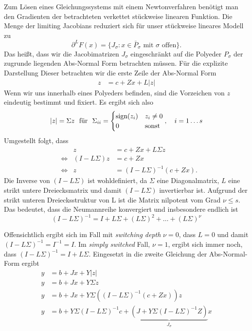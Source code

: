 Zum Lösen eines Gleichungssystems mit einem Newtonverfahren benötigt man den Gradienten der betrachteten verkettet stückweise linearen Funktion. 
Die Menge der limiting Jacobians reduziert sich für unser stückweise lineares Modell zu 
\[
 \partial^L F(x) = \lbrace J_\sigma: x\in \bar P_\sigma \text{ mit }\sigma \text{ offen} \rbrace.
\]
Das heißt, dass wir die Jacobimatrizen $J_\sigma$ eingeschränkt auf die Polyeder $P_\sigma$ der zugrunde liegenden Abs-Normal Form betrachten müssen.
Für die explizite Darstellung Dieser betrachten wir die erste Zeile der Abs-Normal Form
\begin{align*}
	z &= c+ Zx + L|z|
\end{align*}
Wenn wir uns innerhalb eines Polyeders befinden, sind die Vorzeichen von $z$ eindeutig bestimmt und fixiert. Es ergibt sich also  
\begin{align*}
|z| = \Sigma z~ \text{ für }~\Sigma_{ii} =\begin{cases} 
\text{sign}(z_i) & z_i\neq 0\\
0 & \text{sonst}
 \end{cases},\quad i=1\ldots s
\end{align*}
Umgestellt folgt, dass 
\begin{align*}
&&z &= c+ Zx + L\Sigma z\\
&\iff & (I-L\Sigma)z &= c+ Zx \\
&\iff & z &= (I-L\Sigma)^{-1}(c+ Zx).
\end{align*}
Die Inverse von $(I-L\Sigma)$ ist wohldefiniert, da $\Sigma$ eine Diagonalmatrix, $L$ eine strikt untere Dreiecksmatrix und damit $(I-L\Sigma)$ invertierbar ist. 
Aufgrund der strikt unteren Dreiecksstruktur von L ist die Matrix nilpotent vom Grad $\nu\leq s$. Das bedeutet, dass die Neumannreihe konvergiert und insbesondere endlich ist
\[
(I-L\Sigma)^{-1} = I+L\Sigma + (L\Sigma)^2 + \ldots + (L\Sigma)^{\nu}
\] 

Offensichtlich ergibt sich im Fall mit \textit{switching depth} $\nu = 0$, dass $L=0$ und damit $(I-L\Sigma)^{-1} = I^{-1} = I$. Im \textit{simply switched} Fall, $\nu=1$, ergibt sich immer noch, dass $(I-L\Sigma)^{-1} =I+L\Sigma$.
Eingesetzt in die zweite Gleichung der Abs-Normal-Form ergibt
\begin{align*}
y &= b+Jx + Y|z|\\
y &= b+Jx + Y\Sigma z\\
y &= b+ Jx + Y\Sigma ((I-L\Sigma)^{-1}(c+ Zx))z\\
y &= b + Y\Sigma(I-L\Sigma)^{-1}c+\underbrace{(J+Y\Sigma(I-L\Sigma)^{-1}Z)}_{J_\sigma}x \\
\end{align*}

